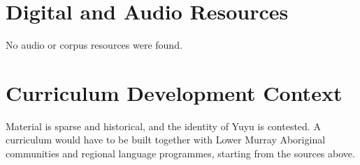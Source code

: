\documentclass[12pt]{article}
\begin{document}
\section{Digital and Audio Resources}
No audio or corpus resources were found.

\section{Curriculum Development Context}
Material is sparse and historical, and the identity of Yuyu is contested. A curriculum would have to be built together with Lower Murray Aboriginal communities and regional language programmes, starting from the sources above.
\end{document}
